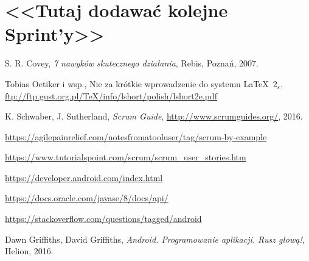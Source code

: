 \documentclass[a4paper]{article}
\begin{document}
\section*{<<Tutaj dodawać kolejne Sprint'y>>}

\begin{thebibliography}{9}

 S. R. Covey, {\em 7 nawyków skutecznego działania}, Rebis, Poznań, 2007.

 Tobias Oetiker i wsp., Nie za krótkie wprowadzenie do systemu \LaTeX  \ $2_\varepsilon$, \url{ftp://ftp.gust.org.pl/TeX/info/lshort/polish/lshort2e.pdf}

 K. Schwaber, J. Sutherland, {\em Scrum Guide}, \url{http://www.scrumguides.org/}, 2016.

 \url{https://agilepainrelief.com/notesfromatooluser/tag/scrum-by-example}

 \url{https://www.tutorialspoint.com/scrum/scrum_user_stories.htm}

 \url{https://developer.android.com/index.html}

 \url{https://docs.oracle.com/javase/8/docs/api/}

 \url{https://stackoverflow.com/questions/tagged/android}

 Dawn Griffiths, David Griffiths, {\em Android. Programowanie aplikacji. Rusz głową!}, Helion, 2016.

\end{thebibliography}
\end{document}
